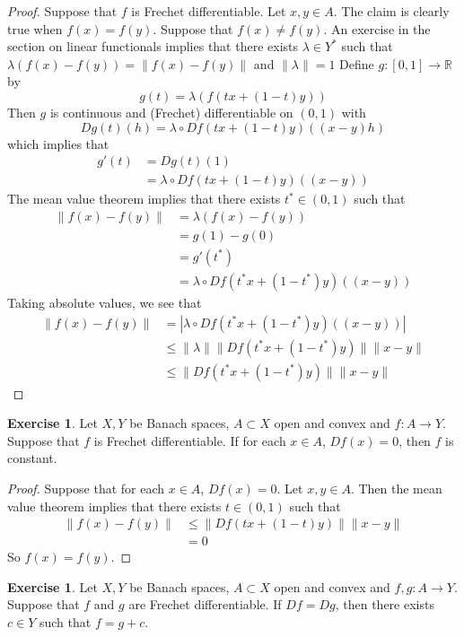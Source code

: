 \documentclass[12pt]{amsart}
\theoremstyle{definition}
\newtheorem{ex}[definition]{Exercise}
\newcommand{\lam}{\lambda}
\newcommand{\R}{\mathbb{R}}
\DeclareMathOperator*{\0}{\mbf{0}}
\DeclareMathOperator*{\1}{\mbf{1}}
\newcommand{\lex}[1]{\label{ex:#1}}
\begin{document}
	\begin{proof}
	Suppose that $f$ is Frechet differentiable. Let $x,y \in A$. The claim is clearly true when $f(x) = f(y)$. Suppose that $f(x) \neq f(y)$. An exercise in the section on linear functionals implies that there exists $\lam \in Y^*$ such that $\lam(f(x)-f(y)) = \| f(x) - f(y)\|$ and $\|\lam \| = 1$
	Define $g:[0,1] \rightarrow \R$ by $$g(t) = \lam(f(tx +(1-t)y))$$ Then $g$ is continuous and (Frechet) differentiable on $(0,1)$ with $$Dg(t)(h) = \lam \circ Df(tx+(1-t)y)((x-y)h)$$ which implies that
	\begin{align*}
	g'(t) 
	&= Dg(t)(1)\\
	&= \lam \circ Df(tx+(1-t)y)((x-y))
	\end{align*}
	The mean value theorem implies that there exists $t^* \in (0,1)$ such that 
	\begin{align*}
	\|f(x) - f(y)\|
	&= \lam(f(x) - f(y)) \\
	&= g(1) - g(0) \\
	&= g'(t^*)\\
	&= \lam \circ Df(t^*x+(1-t^*)y)((x-y))
	\end{align*}
	Taking absolute values, we see that 
	\begin{align*}
	\|f(x) - f(y)\|
	&= |\lam \circ Df(t^*x+(1-t^*)y)((x-y))| \\
	& \leq \|\lam \| \|Df(t^*x+(1-t^*)y)\|\|x-y\| \\
	& \leq \|Df(t^*x+(1-t^*)y)\|\|x-y\|
	\end{align*}
	\end{proof}
	
	\begin{ex} \lex{64004}
	Let $X, Y$ be Banach spaces, $A \subset X$ open and convex and $f:A \rightarrow Y$. Suppose that $f$ is Frechet differentiable. If for each $x \in A$, $Df(x) = 0$, then $f$ is constant.
	\end{ex}
	
	\begin{proof}
	Suppose that for each $x \in A$, $Df(x) = 0$. Let $x,y \in A$. Then the mean value theorem implies that there exists $t \in (0, 1)$ such that 
	\begin{align*}
	\|f(x) - f(y)\| 
	&\leq \|Df(tx + (1-t)y)\| \|x-y\| \\
	&= 0
	\end{align*}
	So $f(x) = f(y)$. 
	\end{proof}
	
	\begin{ex} \lex{64005}
	Let $X, Y$ be Banach spaces, $A \subset X$ open and convex and $f,g:A \rightarrow Y$. Suppose that $f$ and $g$ are Frechet differentiable. If $Df = Dg$, then there exists $c \in Y$ such that $f = g+c$.
	\end{ex}
	
\end{document}
